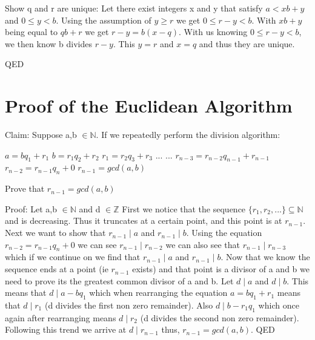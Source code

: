 \documentclass{article}
\begin{document}
Show q and r are unique: Let there exist integers x and y that satisfy $a < xb+ y$ and $0 \leq y < b$. Using the assumption of $y \geq r$ we get $0 \leq r -y < b$. With $xb+y$ being equal to $qb+r$ we get $r-y = b(x-q)$. With us knowing $0 \leq r-y < b$, we then know b divides $r-y$. This $y=r$ and $x = q$ and thus they are unique. 

QED
\pagebreak
\section{Proof of the Euclidean Algorithm}
Claim: Suppose a,b $\in \mathbb{N}$. If we repeatedly perform the division algorithm:
\begin{adjustwidth}{1cm}{}
 $a = bq_1 + r_1$\newline
 $b=r_1q_2+r_2$\newline
 $r_1 = r_2q_3+r_3$\newline
 ...\newline
 ...\newline
 $r_{n-3} = r_{n-2} q_{n-1} + r_{n-1}$\newline
 $r_{n-2} = r_{n-1} q_n + 0$\newline
 $r_{n-1} = gcd(a,b)$
 \end{adjustwidth}
Prove that $r_{n-1} = gcd(a,b)$
 
Proof: Let a,b $\in \mathbb{N}$ and d $\in \mathbb{Z}$  First we notice that the sequence $\{r_1,r_2,...\} \subseteq \mathbb{N}$ and is decreasing. Thus it truncates at a certain point, and this point is at $r_{n-1}$. Next we want to show that $r_{n-1} \mid a$ and $r_{n-1} \mid b$. Using the equation $r_{n-2} = r_{n-1} q_n + 0$ we can see $r_{n-1} \mid r_{n-2}$ we can also see that $r_{n-1} \mid r_{n-3}$ which if we continue on we find that $r_{n-1} \mid a$ and $r_{n-1} \mid b$. Now that we know the sequence ends at a point (ie $r_{n-1}$ exists) and that point is a divisor of a and b we need to prove its the greatest common divisor of a and b. Let $d \mid a$ and $d \mid b$. This means that $d \mid a-bq_1$ which when rearranging the equation $a = bq_1 + r_1$ means that $d \mid r_1$ (d divides the first non zero remainder). Also  $d \mid b-r_1q_1$ which once again after rearranging means $d \mid r_2$ (d divides the second non zero remainder). Following this trend we arrive at $d \mid r_{n-1}$ thus, $r_{n-1} = gcd(a,b)$.\newline\newline
QED
\end{document}
